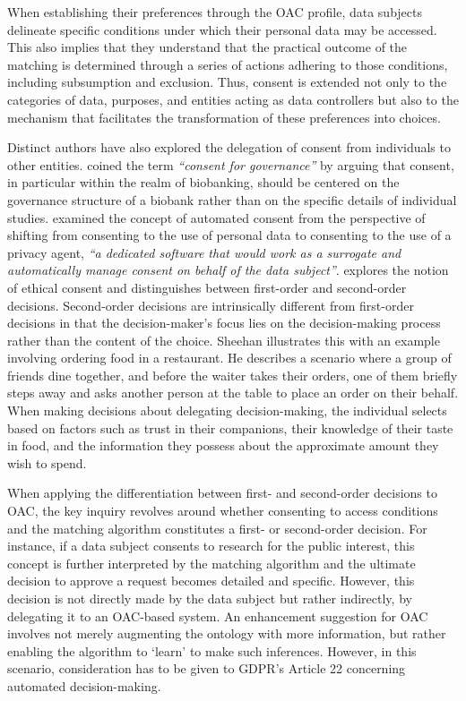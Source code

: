When establishing their preferences through the OAC profile, data subjects delineate specific conditions under which their personal data may be accessed.
This also implies that they understand that the practical outcome of the matching is determined through a series of actions adhering to those conditions, including subsumption and exclusion.
Thus, consent is extended not only to the categories of data, purposes, and entities acting as data controllers but also to the mechanism that facilitates the transformation of these preferences into choices.

Distinct authors have also explored the delegation of consent from individuals to other entities.
\cite{boers_broad_2015} coined the term \textit{``consent for governance''} by arguing that consent, in particular within the realm of biobanking, should be centered on the governance structure of a biobank rather than on the specific details of individual studies.
\cite{le_metayer_automated_2009} examined the concept of automated consent from the perspective of shifting from consenting to the use of personal data to consenting to the use of a privacy agent, \textit{``a dedicated software that would work as a surrogate and automatically manage consent on behalf of the data subject''}.
\cite{sheehan_can_2011} explores the notion of ethical consent and distinguishes between first-order and second-order decisions.
Second-order decisions are intrinsically different from first-order decisions in that the decision-maker's focus lies on the decision-making process rather than the content of the choice.
Sheehan illustrates this with an example involving ordering food in a restaurant.
He describes a scenario where a group of friends dine together, and before the waiter takes their orders, one of them briefly steps away and asks another person at the table to place an order on their behalf.
When making decisions about delegating decision-making, the individual selects based on factors such as trust in their companions, their knowledge of their taste in food, and the information they possess about the approximate amount they wish to spend.

When applying the differentiation between first- and second-order decisions to OAC, the key inquiry revolves around whether consenting to access conditions and the matching algorithm constitutes a first- or second-order decision.
For instance, if a data subject consents to research for the public interest, this concept is further interpreted by the matching algorithm and the ultimate decision to approve a request becomes detailed and specific.
However, this decision is not directly made by the data subject but rather indirectly, by delegating it to an OAC-based system.
An enhancement suggestion for OAC involves not merely augmenting the ontology with more information, but rather enabling the algorithm to `learn' to make such inferences.
However, in this scenario, consideration has to be given to GDPR's  Article 22 \citeyearpar{noauthor_regulation_2016} concerning automated decision-making.

